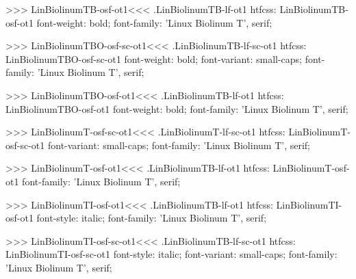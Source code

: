 {{{>>>
\<LinBiolinumTB-osf-ot1\><<<
.LinBiolinumTB-lf-ot1
htfcss:  LinBiolinumTB-osf-ot1  font-weight: bold; font-family: 'Linux Biolinum T', serif;

>>>
\<LinBiolinumTBO-osf-sc-ot1\><<<
.LinBiolinumTB-lf-sc-ot1
htfcss:  LinBiolinumTBO-osf-sc-ot1  font-weight: bold; font-variant: small-caps; font-family: 'Linux Biolinum T', serif;

>>>
\<LinBiolinumTBO-osf-ot1\><<<
.LinBiolinumTB-lf-ot1
htfcss:  LinBiolinumTBO-osf-ot1  font-weight: bold; font-family: 'Linux Biolinum T', serif;

>>>
\<LinBiolinumT-osf-sc-ot1\><<<
.LinBiolinumT-lf-sc-ot1
htfcss:  LinBiolinumT-osf-sc-ot1  font-variant: small-caps; font-family: 'Linux Biolinum T', serif;

>>>
\<LinBiolinumT-osf-ot1\><<<
.LinBiolinumTB-lf-ot1
htfcss:  LinBiolinumT-osf-ot1  font-family: 'Linux Biolinum T', serif;

>>>
\<LinBiolinumTI-osf-ot1\><<<
.LinBiolinumTB-lf-ot1
htfcss:  LinBiolinumTI-osf-ot1  font-style: italic; font-family: 'Linux Biolinum T', serif;

>>>
\<LinBiolinumTI-osf-sc-ot1\><<<
.LinBiolinumTB-lf-sc-ot1
htfcss:  LinBiolinumTI-osf-sc-ot1  font-style: italic; font-variant: small-caps; font-family: 'Linux Biolinum T', serif;

}}}
